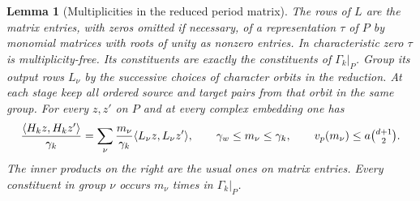 \documentclass[a4paper,11pt]{article}
\newtheorem{lemma}[proposition]{Lemma}
\theoremstyle{definition}
\theoremstyle{remark}
\numberwithin{equation}{section}
\begin{document}
\begin{lemma}[Multiplicities in the reduced period matrix]
\leavevmode\label{lem:reducedmultiplicities628}
The rows of \(L\) are the matrix entries, with zeros omitted
if necessary, of a representation \(\tau\) of \(P\) by monomial
matrices with roots of unity as nonzero entries. In characteristic
zero \(\tau\) is multiplicity-free. Its constituents are exactly
the constituents of \(\Gamma_k|_P\).
Group its output rows \(L_\nu\) by the successive choices of
character orbits in the reduction. At each stage keep all ordered
source and target pairs from that orbit in the same group.
For every \(z,z'\) on \(P\) and at every complex embedding one has
\[
 \frac{\langle H_kz,H_kz'\rangle}{\gamma_k}=
       \sum_\nu \frac{m_\nu}{\gamma_k}
                       \langle L_\nu z,L_\nu z'\rangle,\qquad
 \gamma_w\le m_\nu\le\gamma_k,\qquad
 v_p(m_\nu)\le a\tbinom{d+1}2 .
\]
The inner products on the right are the usual ones on matrix entries.
Every constituent in group \(\nu\) occurs \(m_\nu\) times in
\(\Gamma_k|_P\).
\end{lemma}
\end{document}
